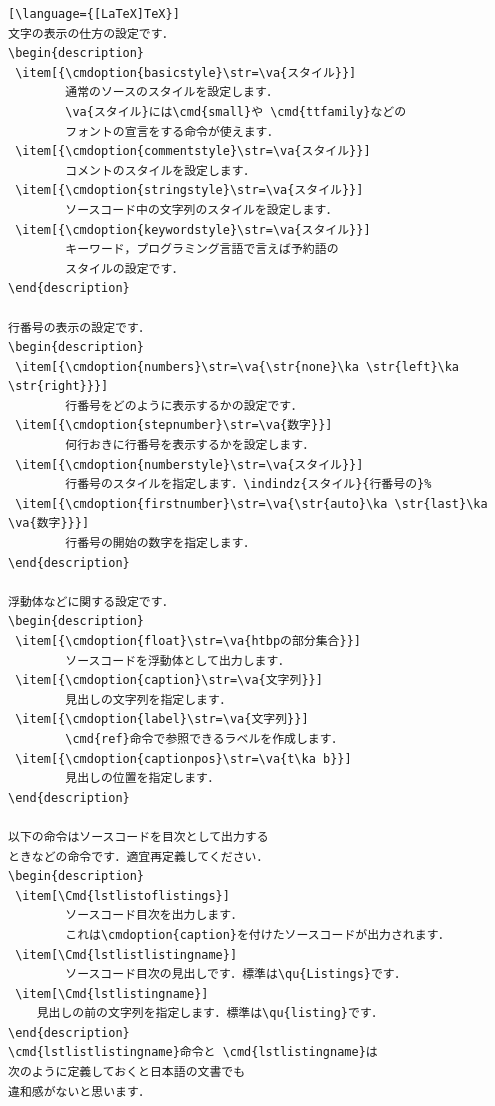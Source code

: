 \begin{InTeX}
\begin{lstlisting}[\language={[LaTeX]TeX}]
文字の表示の仕方の設定です．
\begin{description}
 \item[{\cmdoption{basicstyle}\str=\va{スタイル}}] 
	    通常のソースのスタイルを設定します．
	    \va{スタイル}には\cmd{small}や \cmd{ttfamily}などの
	    フォントの宣言をする命令が使えます．
 \item[{\cmdoption{commentstyle}\str=\va{スタイル}}] 
	    コメントのスタイルを設定します．
 \item[{\cmdoption{stringstyle}\str=\va{スタイル}}] 
	    ソースコード中の文字列のスタイルを設定します．
 \item[{\cmdoption{keywordstyle}\str=\va{スタイル}}] 
	    キーワード，プログラミング言語で言えば予約語の
	    スタイルの設定です．
\end{description}

行番号の表示の設定です．
\begin{description}
 \item[{\cmdoption{numbers}\str=\va{\str{none}\ka \str{left}\ka \str{right}}}]
	    行番号をどのように表示するかの設定です．
 \item[{\cmdoption{stepnumber}\str=\va{数字}}]
	    何行おきに行番号を表示するかを設定します．
 \item[{\cmdoption{numberstyle}\str=\va{スタイル}}]
	    行番号のスタイルを指定します．\indindz{スタイル}{行番号の}%
 \item[{\cmdoption{firstnumber}\str=\va{\str{auto}\ka \str{last}\ka \va{数字}}}]
	    行番号の開始の数字を指定します．
\end{description}

浮動体などに関する設定です．
\begin{description}
 \item[{\cmdoption{float}\str=\va{htbpの部分集合}}]  
	    ソースコードを浮動体として出力します．
 \item[{\cmdoption{caption}\str=\va{文字列}}]
	    見出しの文字列を指定します．
 \item[{\cmdoption{label}\str=\va{文字列}}]
	    \cmd{ref}命令で参照できるラベルを作成します．
 \item[{\cmdoption{captionpos}\str=\va{t\ka b}}]
	    見出しの位置を指定します．
\end{description}

以下の命令はソースコードを目次として出力する
ときなどの命令です．適宜再定義してください．
\begin{description}
 \item[\Cmd{lstlistoflistings}]
	    ソースコード目次を出力します．
	    これは\cmdoption{caption}を付けたソースコードが出力されます．
 \item[\Cmd{lstlistlistingname}]
	    ソースコード目次の見出しです．標準は\qu{Listings}です．
 \item[\Cmd{lstlistingname}]
    見出しの前の文字列を指定します．標準は\qu{listing}です．
\end{description}
\cmd{lstlistlistingname}命令と \cmd{lstlistingname}は
次のように定義しておくと日本語の文書でも
違和感がないと思います．


\end{lstlisting}
\end{InTeX}
